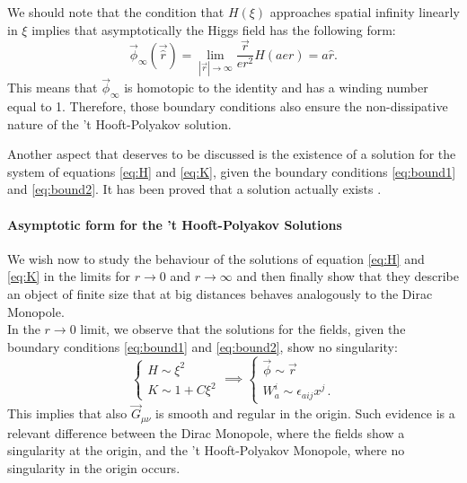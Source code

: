 \documentclass[main.tex]{subfiles}
\begin{document}
 We should note that the condition that $H(\xi)$ approaches  spatial infinity linearly in $\xi$ implies that asymptotically the Higgs field has the following form: 
 \begin{equation}
 \vec{\phi}_{\infty}(\vec{\hat{r}}) = \lim_{|\vec{r}| \to \infty } \frac{\vec{r}}{er^2}H(aer) = a \hat{r}.
 \end{equation}
 This means that $\vec{\phi}_{\infty}$ is homotopic to the identity and has a winding number equal to 1. Therefore, those boundary conditions also ensure the non-dissipative nature of the  't Hooft-Polyakov solution.
 
Another aspect that deserves to be discussed is the existence of a solution for the system of equations \eqref{eq:H} and \eqref{eq:K}, given the boundary conditions \eqref{eq:bound1} and \eqref{eq:bound2}. It has been proved that a solution actually exists \cite{Taubes:Sol}.

\paragraph{Asymptotic form for the 't Hooft-Polyakov Solutions} 
We wish now to study the behaviour of the solutions of equation \eqref{eq:H} and \eqref{eq:K} in the limits for $r \to 0$ and $r \to \infty$ and then finally show that they describe an object of finite size that at big distances behaves analogously to the Dirac Monopole.\\

In the $r \to 0$ limit, we observe that the solutions for the fields, given the boundary conditions \eqref{eq:bound1} and \eqref{eq:bound2}, show no singularity: 
\begin{equation}
  \begin{cases}  
  H \sim \xi^2\\
  K \sim 1 + C \xi^2 
  \end{cases}
  \implies
  \begin{cases}
  \vec{\phi} \sim \vec{r}\\
  W^{i}_{a} \sim \epsilon_{aij}x^j\,.
  \end{cases}
\end{equation}
This implies that also   $\vec{G}_{\mu \nu}$ is smooth and regular in the origin. Such evidence is a relevant difference between the Dirac Monopole, where the fields show a singularity at the origin, and the 't Hooft-Polyakov Monopole, where no singularity in the origin occurs. \\
\end{document}
